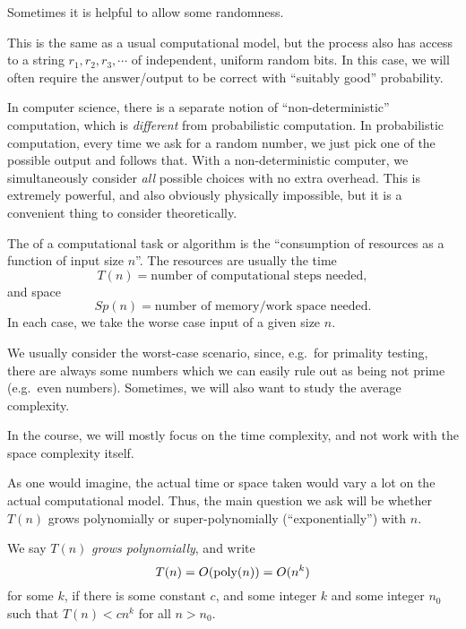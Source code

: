 Sometimes it is helpful to allow some randomness.
\begin{defi}
  This is the same as a usual computational model, but the process also has access to a string $r_1, r_2, r_3, \cdots$ of independent, uniform random bits. In this case, we will often require the answer/output to be correct with ``suitably good'' probability.
\end{defi}

In computer science, there is a separate notion of ``non-deterministic'' computation, which is \emph{different} from probabilistic computation. In probabilistic computation, every time we ask for a random number, we just pick one of the possible output and follows that. With a non-deterministic computer, we simultaneously consider \emph{all} possible choices with no extra overhead. This is extremely powerful, and also obviously physically impossible, but it is a convenient thing to consider theoretically.

\begin{defi}
  The  of a computational task or algorithm is the ``consumption of resources as a function of input size $n$''. The resources are usually the time
  \[
    T(n) = \text{number of computational steps needed},
  \]
  and space
  \[
    Sp(n) = \text{number of memory/work space needed}.
  \]
  In each case, we take the worse case input of a given size $n$.
\end{defi}
We usually consider the worst-case scenario, since, e.g.\ for primality testing, there are always some numbers which we can easily rule out as being not prime (e.g.\ even numbers). Sometimes, we will also want to study the average complexity.

In the course, we will mostly focus on the time complexity, and not work with the space complexity itself.

As one would imagine, the actual time or space taken would vary a lot on the actual computational model. Thus, the main question we ask will be whether $T(n)$ grows polynomially or super-polynomially (``exponentially'') with $n$.
\begin{defi}
  We say $T(n)$ \emph{grows polynomially}, and write
  \[
    T(n) = O(\operatorname{poly}(n)) = O(n^k)
  \]
  for some $k$, if there is some constant $c$, and some integer $k$ and some integer $n_0$ such that $T(n) < c n^k$ for all $n > n_0$.
\end{defi}

